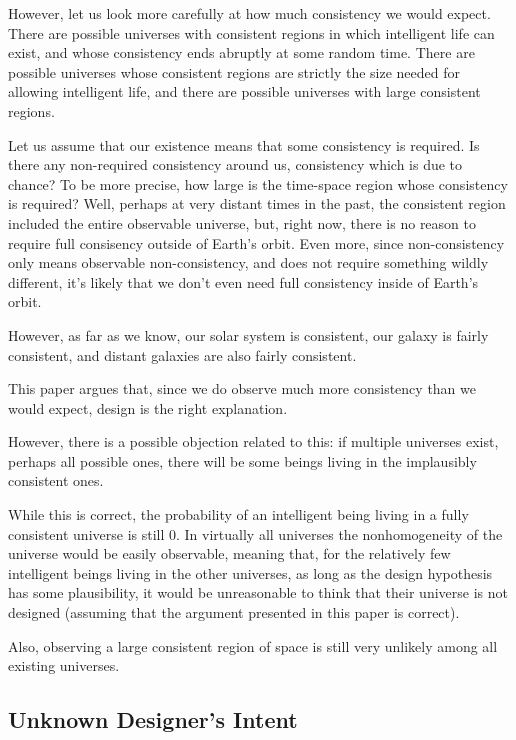 \documentclass[a4paper
]{article}
\newcommand{\paper}[1]{paper}
\begin{document}
However, let us look more carefully at how much consistency we would expect.
There are possible universes with consistent regions in which
intelligent life can exist, and whose consistency ends abruptly at some
random time. There are possible universes whose consistent regions are
strictly the size needed for allowing intelligent life, and there are possible
universes with large consistent regions.

Let us assume that our existence means that some consistency is required.
Is there any non-required consistency around us, consistency which is due to
chance? To be more precise,
how large is the time-space region whose consistency is required? Well,
perhaps at very distant times in the past, the consistent region included
the entire observable universe, but, right now, there is no reason to require
full consisency outside of Earth's orbit. Even more, since non-consistency
only means
observable non-consistency, and does not require something wildly different,
it's likely that we don't even need full consistency inside of Earth's orbit.

However, as far as we know, our solar system is consistent, our galaxy is
fairly consistent, and distant galaxies are also fairly consistent.

This \paper{} argues that, since we do observe much more consistency
than we would expect, design is the right explanation.

However, there is a possible objection related to this: if multiple universes
exist, perhaps all possible ones, there will be some beings living in the
implausibly consistent ones.

While this is correct, the probability of an intelligent being
living in a fully consistent universe is still $0$.
In virtually all universes the nonhomogeneity of the universe would be
easily observable, meaning that, for the relatively few intelligent beings
living in the other universes, as long as the design hypothesis
has some plausibility, it would be unreasonable to think that
their universe is not designed (assuming that the argument presented in
this \paper{} is correct).

Also, observing a large consistent region of space is still very unlikely among
all existing universes.


\subsection{Unknown Designer's Intent}
\label{sec:unknown-designer-intent}
\end{document}
